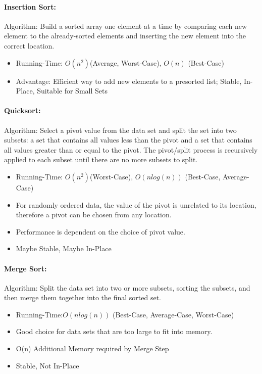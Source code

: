 \documentclass[12pt]{article}
\begin{document}
\paragraph{Insertion Sort:}
Algorithm: Build a sorted array one element at a time by comparing each new element to the already-sorted elements and inserting the new element into the correct location.
\begin{itemize}
	\item Running-Time: \(O(n^2) \)(Average, Worst-Case), \(O(n) \) (Best-Case)
	\item Advantage: Efficient way to add new elements to a presorted list; Stable, In-Place, Suitable for Small Sets
\end{itemize}

\paragraph{Quicksort:}
Algorithm: Select a pivot value from the data set and split the set into two subsets: a set that contains all values less than the pivot and a set that contains all values greater than or equal to the pivot.  The pivot/split process is recursively applied to each subset until there are no more subsets to split.
\begin{itemize}
	\item Running-Time: \(O(n^2) \)(Worst-Case), \(O(n log(n)) \) (Best-Case, Average-Case)
	\item For randomly ordered data, the value of the pivot is unrelated to its location, therefore a pivot can be chosen from any location.
	\item Performance is dependent on the choice of pivot value.
	\item Maybe Stable, Maybe In-Place
\end{itemize}

\paragraph{Merge Sort:}
Algorithm: Split the data set into two or more subsets, sorting the subsets, and then merge them together into the final sorted set.
\begin{itemize}
	\item Running-Time:\(O(n log(n)) \) (Best-Case, Average-Case, Worst-Case)
	\item Good choice for data sets that are too large to fit into memory.
	\item O(n) Additional Memory required by Merge Step
	\item Stable, Not In-Place
\end{itemize}
\end{document}
